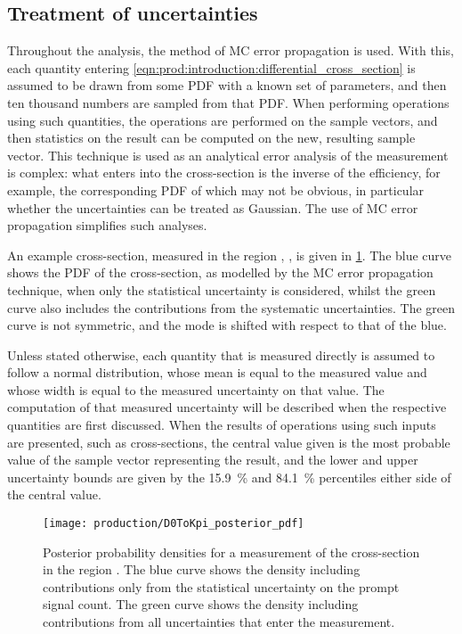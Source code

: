 \subsection{Treatment of uncertainties}
\label{chap:prod:introduction:uncertainties}

Throughout the analysis, the method of \acl{MC} error propagation is used.
With this, each quantity entering 
\cref{eqn:prod:introduction:differential_cross_section} is assumed to be drawn 
from some \acf{PDF} with a known set of parameters, and then ten thousand 
numbers are sampled from that \ac{PDF}.
When performing operations using such quantities, the operations are performed 
on the sample vectors, and then statistics on the result can be computed on the 
new, resulting sample vector.
This technique is used as an analytical error analysis of the measurement is 
complex: what enters into the cross-section is the inverse of the efficiency, 
for example, the corresponding \acl{PDF} of which may not be obvious, in 
particular whether the uncertainties can be treated as Gaussian.
The use of \acl{MC} error propagation simplifies such analyses.

An example cross-section, measured in the region , 
, is given in 
\cref{fig::prod:introduction:uncertainties:posterior}.
The blue curve shows the \ac{PDF} of the cross-section, as modelled by the 
\ac{MC} error propagation technique, when only the statistical uncertainty is 
considered, whilst the green curve also includes the contributions from the 
systematic uncertainties.
The green curve is not symmetric, and the mode is shifted with respect to that 
of the blue.

Unless stated otherwise, each quantity that is measured directly is assumed to 
follow a normal distribution, whose mean is equal to the measured value and 
whose width is equal to the measured uncertainty on that value.
The computation of that measured uncertainty will be described when the 
respective quantities are first discussed.
When the results of operations using such inputs are presented, such as 
cross-sections, the central value given is the most probable value of the 
sample vector representing the result, and the lower and upper uncertainty 
bounds are given by the \SI{15.9}{\percent} and \SI{84.1}{\percent} percentiles 
either side of the central value.

\begin{figure}
  \centering
  \texttt{[image: production/D0ToKpi\_posterior\_pdf]}
  \caption{%
    Posterior probability densities for a measurement of the \PDzero 
    cross-section in the region .
    The blue curve shows the density including contributions only from the 
    statistical uncertainty on the prompt signal count.
    The green curve shows the density including contributions from all 
    uncertainties that enter the measurement.
  }
  \label{fig::prod:introduction:uncertainties:posterior}
\end{figure}

